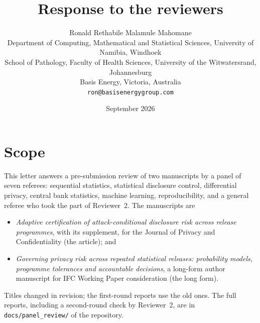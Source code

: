 \documentclass[11pt,a4paper]{article}
\title{\bfseries Response to the reviewers}
\author{Ronald Rethabile Malamule Mahomane\\[2pt]
\small Department of Computing, Mathematical and Statistical Sciences, University of Namibia, Windhoek\\
\small School of Pathology, Faculty of Health Sciences, University of the Witwatersrand, Johannesburg\\
\small Basis Energy, Victoria, Australia\\
\small \texttt{ron@basisenergygroup.com}}
\date{September 2026}
\begin{document}
\maketitle
\sloppy

\section*{Scope}
This letter answers a pre-submission review of two manuscripts by a panel of seven
referees: sequential statistics, statistical disclosure control, differential privacy,
central bank statistics, machine learning, reproducibility, and a general referee who
took the part of Reviewer~2. The manuscripts are
\begin{itemize}
\item \emph{Adaptive certification of attack-conditional disclosure risk across release
programmes}, with its supplement, for the Journal of Privacy and Confidentiality
(the article); and
\item \emph{Governing privacy risk across repeated statistical releases: probability
models, programme tolerances and accountable decisions}, a long-form author manuscript
for IFC Working Paper consideration (the long form).
\end{itemize}
Titles changed in revision; the first-round reports use the old ones. The full reports,
including a second-round check by Reviewer~2, are in \texttt{docs/panel\_review/} of the
repository.
\end{document}
